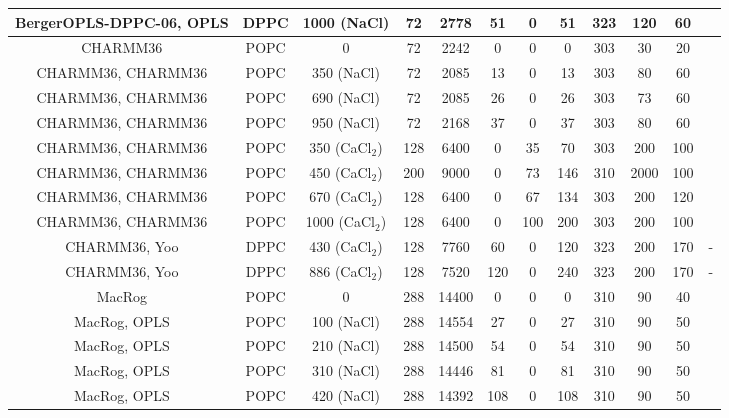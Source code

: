 \documentclass[twoside,twocolumn,9pt]{article}
\begin{document}
\begin{table}
\begin{tabular}{c c c c c c c c c c c c}
  BergerOPLS-DPPC-06\cite{tieleman06}, OPLS\cite{aqvist90} &   DPPC & 1000 (NaCl) & 72 & 2778 & 51  & 0  & 51 &323  & 120 & 60 &\cite{bergerOPLSDPPCfiles1000mMnacl} \\
  \hline
  CHARMM36\cite{klauda10}   & POPC & 0           & 72 & 2242 & 0  & 0 & 0 & 303  & 30 & 20 & \cite{charmm36filesSHORT} \\
  CHARMM36\cite{klauda10}, CHARMM36\cite{venable13} & POPC & 350 (NaCl)  & 72 & 2085 & 13  & 0 & 13 & 303  & 80 & 60 & \cite{charmmPOPC350mMNaClfiles} \\
  CHARMM36\cite{klauda10}, CHARMM36\cite{venable13} & POPC & 690 (NaCl)  & 72 & 2085 & 26  & 0 & 26 & 303  & 73 & 60 & \cite{charmmPOPC690mMNaClfiles}   \\
  CHARMM36\cite{klauda10}, CHARMM36\cite{venable13}  & POPC & 950 (NaCl)  & 72 & 2168 & 37  & 0 & 37 & 303  & 80 & 60 &\cite{charmmPOPC950mMNaClfiles}  \\
  CHARMM36\cite{klauda10}, CHARMM36 & POPC &  350 (CaCl$_2$)  & 128 & 6400 & 0& 35 & 70 & 303  & 200  & 100 & \cite{charmmPOPC350mMCaClfiles}  \\
  CHARMM36\cite{klauda10}, CHARMM36 & POPC &  450 (CaCl$_2$)  & 200 & 9000 & 0& 73 & 146 & 310  & 2000  & 100 & \cite{charmmPOPC450mMCaClfiles}  \\
  CHARMM36\cite{klauda10}, CHARMM36 & POPC &  670 (CaCl$_2$)  & 128 & 6400 & 0& 67 & 134 & 303  & 200  & 120 & \cite{charmmPOPC670mMCaClfiles}  \\  
  CHARMM36\cite{klauda10}, CHARMM36 & POPC &  1000 (CaCl$_2$) & 128 & 6400 & 0& 100 & 200 & 303 & 200  & 100 & \cite{charmmPOPC1000mMCaClfiles}  \\
  \hline
  CHARMM36\cite{klauda10}, Yoo\cite{yoo16}  & DPPC & 430 (CaCl$_2$)  & 128 & 7760 & 60  & 0 & 120 & 323  & 200 & 170 & -  \\
  CHARMM36\cite{klauda10}, Yoo\cite{yoo16}  & DPPC & 886 (CaCl$_2$)  & 128 & 7520 & 120  & 0 & 240 & 323  & 200 & 170 & -  \\
  \hline
  MacRog\cite{maciejewski14}  & POPC & 0 & 288 & 14400 & 0 & 0 & 0 & 310 & 90&40  &~\cite{macrogdehydFILES}  \\
  MacRog\cite{maciejewski14}, OPLS\cite{aqvist90}  & POPC & 100 (NaCl) & 288 & 14554 & 27 & 0 & 27 & 310 & 90&50  & \cite{macrogIONfiles} \\
  MacRog\cite{maciejewski14}, OPLS\cite{aqvist90}  & POPC &  210 (NaCl) & 288 & 14500 & 54 & 0 & 54 & 310 & 90&50  &\cite{macrogIONfiles}  \\
  MacRog\cite{maciejewski14}, OPLS\cite{aqvist90}  & POPC &   310 (NaCl) & 288 & 14446 & 81 & 0 & 81 & 310 & 90&50  & \cite{macrogIONfiles} \\
  MacRog\cite{maciejewski14}, OPLS\cite{aqvist90}  & POPC &   420 (NaCl) & 288 & 14392 & 108 & 0 & 108 & 310 & 90& 50  & \cite{macrogIONfiles}  \\
\end{tabular}
\end{table} 
\end{document}
